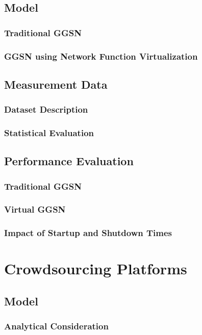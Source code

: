 \subsection{Model}
\subsubsection*{Traditional GGSN}
\subsubsection*{GGSN using Network Function Virtualization}
\subsection{Measurement Data}
\subsubsection*{Dataset Description}
\subsubsection*{Statistical Evaluation}
\subsection{Performance Evaluation}
\subsubsection*{Traditional GGSN}
\subsubsection*{Virtual GGSN}
\subsubsection*{Impact of Startup and Shutdown Times}

\section{Crowdsourcing Platforms}
\cite{Schwartz2015}
\subsection{Model}
\subsubsection*{Analytical Consideration}
